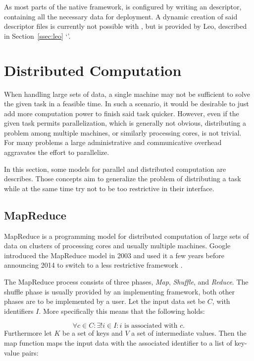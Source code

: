 As most parts of the native \uima{} framework, \uimaas{} is configured by writing an \xml{} descriptor, containing all the necessary data for deployment. A dynamic creation of said descriptor files is currently not possible with \uimafit{}, but is provided by Leo, described in Section~\ref{ssec:leo} `'.

\section{Distributed Computation}
When handling large sets of data, a single machine may not be sufficient to solve the given task in a feasible time. In such a scenario, it would be desirable to just add more computation power to finish said task quicker. However, even if the given task permits parallelization, which is generally not obvious, distributing a problem among multiple machines, or similarly processing cores, is not trivial. For many problems a large administrative and communicative overhead aggravates the effort to parallelize.

In this section, some models for parallel and distributed computation are describes. Those concepts aim to generalize the problem of distributing a task while at the same time try not to be too restrictive in their interface. 

\subsection{MapReduce}
MapReduce is a programming model for distributed computation of large sets of data on clusters of processing cores and usually multiple machines. Google introduced the MapReduce model in 2003 and used it a few years before announcing 2014 to switch to a less restrictive framework \cite{dean2008mapreduce}.

The MapReduce process consists of three phases, \emph{Map}, \emph{Shuffle}, and \emph{Reduce}. The shuffle phase is usually provided by an implementing framework, both other phases are to be implemented by a user. Let the input data set be $C$, with identifiers $I$. More specifically this means that the following holds:

\[\forall{}c\in{}C:\exists!{}i\in{}I:i\text{ is associated with }c.\]
Furthermore let $K$ be a set of keys and $V$ a set of intermediate values. Then the map function maps the input data with the associated identifier to a list of key-value pairs:

